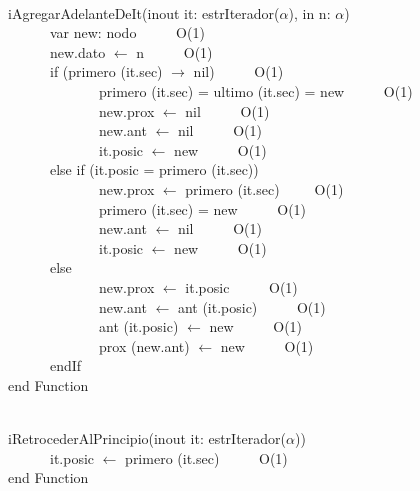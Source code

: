 \documentclass[a4paper,10pt]{article}
\begin{document}
\begin{algoritmo}
\caption{}\\
  iAgregarAdelanteDeIt(inout it: estrIterador($\alpha$), in n: $\alpha$)\\
	\indent \ \ \ \ \ \ var new: nodo \ \ \ \ \ O(1)\\   
	\indent \ \ \ \ \ \ new.dato $\gets$ n \ \ \ \ \ O(1)\\   
	\indent \ \ \ \ \ \ if (primero (it.sec) $\rightarrow$ nil) \ \ \ \ \ O(1)\\  
	\indent \ \ \ \ \ \ \ \ \ \ \ \ \  primero (it.sec) = ultimo (it.sec) = new \ \ \ \ \ O(1)\\  
	\indent \ \ \ \ \ \ \ \ \ \ \ \ \  new.prox $\gets$ nil \ \ \ \ \ O(1)\\  
	\indent \ \ \ \ \ \ \ \ \ \ \ \ \  new.ant  $\gets$ nil \ \ \ \ \ O(1)\\  
	\indent \ \ \ \ \ \ \ \ \ \ \ \ \  it.posic $\gets$ new \ \ \ \ \ O(1)\\  
	\indent \ \ \ \ \ \ else if (it.posic = primero (it.sec))\ \ \ \ \ \\  
	\indent \ \ \ \ \ \ \ \ \ \ \ \ \  new.prox $\gets$ primero (it.sec)\ \ \ \ \ O(1)\\  
	\indent \ \ \ \ \ \ \ \ \ \ \ \ \  primero (it.sec) = new \ \ \ \ \ O(1)\\  
	\indent \ \ \ \ \ \ \ \ \ \ \ \ \  new.ant $\gets$ nil \ \ \ \ \ O(1)\\  
	\indent \ \ \ \ \ \ \ \ \ \ \ \ \  it.posic $\gets$ new \ \ \ \ \ O(1)\\ 
	\indent \ \ \ \ \ \ else \ \ \ \ \ \\  	
	\indent \ \ \ \ \ \ \ \ \ \ \ \ \  new.prox $\gets$ it.posic \ \ \ \ \ O(1)\\  
	\indent \ \ \ \ \ \ \ \ \ \ \ \ \  new.ant $\gets$ ant (it.posic) \ \ \ \ \ O(1)\\  
	\indent \ \ \ \ \ \ \ \ \ \ \ \ \  ant (it.posic) $\gets$ new \ \ \ \ \ O(1)\\
	\indent \ \ \ \ \ \ \ \ \ \ \ \ \  prox (new.ant) $\gets$ new \ \ \ \ \ O(1)\\
	\indent \ \ \ \ \ \ endIf \ \ \ \ \ \\  	
end Function 
\end{algoritmo}

\begin{algoritmo}
\caption{}\\
  iRetrocederAlPrincipio(inout it: estrIterador($\alpha$)) \\
	\indent \ \ \ \ \ \  it.posic $\gets$ primero (it.sec)   \ \ \ \ \ O(1)\\
   end Function 
\end{algoritmo}
\end{document}
